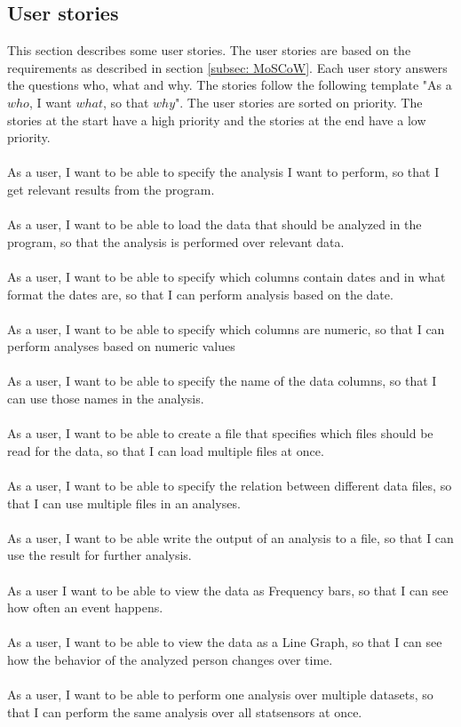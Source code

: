 \subsection{User stories}
\label{subsec:User-stories}
This section describes some user stories. The user stories are based on the requirements as described in section \ref{subsec: MoSCoW}. Each user story answers the questions who, what and why. The stories follow the following template "As a $who$, I want $what$, so that $why$". The user stories are sorted on priority. The stories at the start have a high priority and the stories at the end have a low priority.
\\\\
As a user, I want to be able to specify the analysis I want to perform, so that I get relevant results from the program. 
\\\\
As a user, I want to be able to load the data that should be analyzed in the program, so that the analysis is performed over relevant data. 
\\\\
As a user, I want to be able to specify which columns contain dates and in what format the dates are, so that I can perform analysis based on the date.
\\\\
As a user, I want to be able to specify which columns are numeric, so that I can perform analyses based on numeric values
\\\\
As a user, I want to be able to specify the name of the data columns, so that I can use those names in the analysis.
\\\\
As a user, I want to be able to create a file that specifies which files should be read for the data, so that I can load multiple files at once.
\\\\
As a user, I want to be able to specify the relation between different data files, so that I can use multiple files in an analyses.
\\\\
As a user, I want to be able write the output of an analysis to a file, so that I can use the result for further analysis.
\\\\
As a user I want to be able to view the data as Frequency bars, so that I can see how often an event happens.
\\\\
As a user, I want to be able to view the data as a Line Graph, so that I can see how the behavior of the analyzed person changes over time.
\\\\
As a user, I want to be able to perform one analysis over multiple datasets, so that I can perform the same analysis over all statsensors at once.
